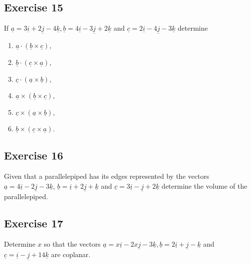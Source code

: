 \documentclass[
  english,
  11pt,
  oneside]{book}
\providecommand{\tightlist}{%
  \setlength{\itemsep}{0pt}\setlength{\parskip}{0pt}}
\newcommand{\slide}{}
\theoremstyle{definition}
\theoremstyle{definition}
\theoremstyle{definition}
\theoremstyle{definition}
\theoremstyle{remark}
\begin{document}
\slide

\subsection*{Exercise 15}\label{exercise-15}

If \(\underline{a} = 3\underline{i} + 2\underline{j} - 4\underline{k}, \underline{b} = 4\underline{i} - 3\underline{j} + 2\underline{k}\) and \(\underline{c} = 2\underline{i} - 4\underline{j} - 3\underline{k}\) determine

\begin{enumerate}
\def\labelenumi{\roman{enumi}.}
\tightlist
\item
  \(\underline{a} \cdot (\underline{b} \times \underline{c})\),
\item
  \(\underline{b} \cdot (\underline{c} \times \underline{a})\),
\item
  \(\underline{c} \cdot (\underline{a} \times \underline{b})\),
\item
  \(\underline{a} \times (\underline{b} \times \underline{c})\),
\item
  \(\underline{c} \times (\underline{a} \times \underline{b})\),
\item
  \(\underline{b} \times (\underline{c} \times \underline{a})\).
\end{enumerate}

\slide

\subsection*{Exercise 16}\label{exercise-16}

Given that a parallelepiped has its edges represented by the vectors \(\underline{a} = 4\underline{i} - 2\underline{j} - 3\underline{k}\), \(\underline{b} = \underline{i} + 2\underline{j} + \underline{k}\) and \(\underline{c} = 3\underline{i} - \underline{j} + 2\underline{k}\) determine the volume of the parallelepiped.

\slide

\subsection*{Exercise 17}\label{exercise-17}

Determine \(x\) so that the vectors \(\underline{a} = x\underline{i} - 2x\underline{j} - 3\underline{k}, \underline{b} =2 \underline{i} + \underline{j} - \underline{k}\) and \(\underline{c} = \underline{i} - \underline{j} + 14\underline{k}\) are coplanar.
\end{document}
